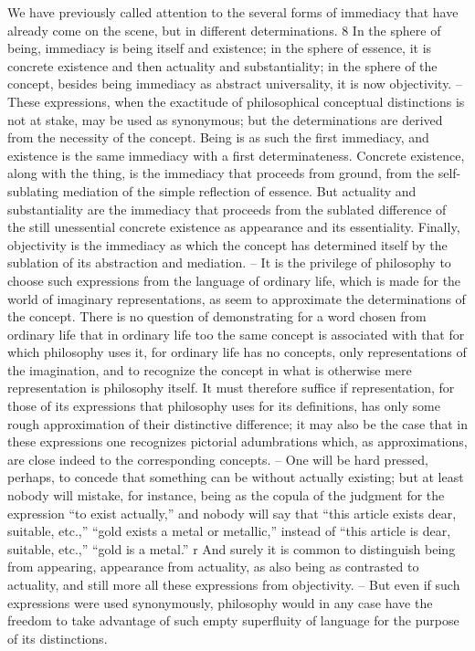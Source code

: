 We have previously called attention to the several forms of immediacy
that have already come on the scene, but in different determinations. 8 In
the sphere of being, immediacy is being itself and existence; in the sphere of
essence, it is concrete existence and then actuality and substantiality; in the
sphere of the concept, besides being immediacy as abstract universality, it is
now objectivity. – These expressions, when the exactitude of philosophical
conceptual distinctions is not at stake, may be used as synonymous; but
the determinations are derived from the necessity of the concept. Being
is as such the first immediacy, and existence is the same immediacy with
a first determinateness. Concrete existence, along with the thing, is the
immediacy that proceeds from ground, from the self-sublating mediation
of the simple reflection of essence. But actuality and substantiality are the
immediacy that proceeds from the sublated difference of the still unessential
concrete existence as appearance and its essentiality. Finally, objectivity is the
immediacy as which the concept has determined itself by the sublation of its
abstraction and mediation. – It is the privilege of philosophy to choose such
expressions from the language of ordinary life, which is made for the world
of imaginary representations, as seem to approximate the determinations
of the concept. There is no question of demonstrating for a word chosen
from ordinary life that in ordinary life too the same concept is associated
with that for which philosophy uses it, for ordinary life has no concepts,
only representations of the imagination, and to recognize the concept in
what is otherwise mere representation is philosophy itself. It must therefore
suffice if representation, for those of its expressions that philosophy uses
for its definitions, has only some rough approximation of their distinctive
difference; it may also be the case that in these expressions one recognizes
pictorial adumbrations which, as approximations, are close indeed to the
corresponding concepts. – One will be hard pressed, perhaps, to concede
that something can be without actually existing; but at least nobody will
mistake, for instance, being as the copula of the judgment for the expression
“to exist actually,” and nobody will say that “this article exists dear, suitable,
etc.,” “gold exists a metal or metallic,” instead of “this article is dear, suitable,
etc.,” “gold is a metal.” r And surely it is common to distinguish being from
appearing, appearance from actuality, as also being as contrasted to actuality,
and still more all these expressions from objectivity. – But even if such
expressions were used synonymously, philosophy would in any case have
the freedom to take advantage of such empty superfluity of language for
the purpose of its distinctions.

